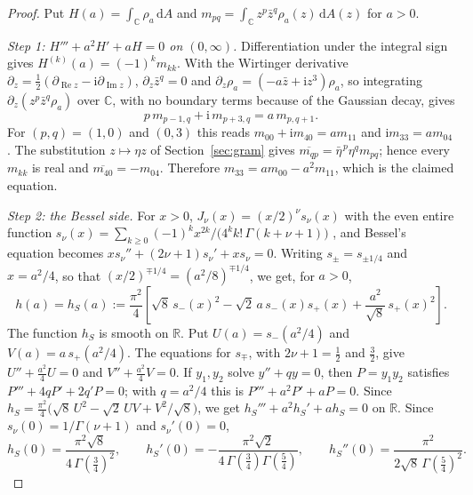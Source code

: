 \documentclass[twoside,10pt]{article}
\numberwithin{equation}{section}
\theoremstyle{slbody}
\theoremstyle{remark}
\newcommand{\C}{\mathbb C}
\newcommand{\dd}{\,\mathrm d}
\newcommand{\ii}{\mathrm i}
\begin{document}
\begin{proof}
Put \(H(a)=\int_\C\rho_a\dd A\) and
\(m_{pq}=\int_\C z^p\bar z^q\rho_a(z)\dd A(z)\) for \(a>0\).

\emph{Step 1: \(H'''+a^2H'+aH=0\) on \((0,\infty)\).}  Differentiation
under the integral sign gives \(H^{(k)}(a)=(-1)^km_{kk}\).  With the
Wirtinger derivative
\(\partial_z=\frac12(\partial_{\operatorname{Re}z}-\ii\partial_{\operatorname{Im}z})\),
\(\partial_z\bar z^q=0\) and
\(\partial_z\rho_a=(-a\bar z+\ii z^3)\rho_a\), so integrating
\(\partial_z(z^p\bar z^q\rho_a)\) over \(\C\), with no boundary terms
because of the Gaussian decay, gives
\[
p\,m_{p-1,q}+\ii\,m_{p+3,q}=a\,m_{p,q+1}.
\]
For \((p,q)=(1,0)\) and \((0,3)\) this reads
\(m_{00}+\ii m_{40}=am_{11}\) and \(\ii m_{33}=am_{04}\).  The
substitution \(z\mapsto\eta z\) of Section~\ref{sec:gram} gives
\(\overline{m_{qp}}=\bar\eta^{\,p}\eta^q m_{pq}\); hence every
\(m_{kk}\) is real and \(\overline{m_{40}}=-m_{04}\).  Therefore
\(m_{33}=am_{00}-a^2m_{11}\), which is the claimed equation.

\emph{Step 2: the Bessel side.}  For \(x>0\),
\(J_\nu(x)=(x/2)^\nu s_\nu(x)\) with the even entire function
\(s_\nu(x)=\sum_{k\geq0}(-1)^kx^{2k}/\bigl(4^kk!\,\Gamma(k+\nu+1)\bigr)\)
\cite[equation~(10.2.2)]{NISTHandbook2010}, and Bessel's equation
\cite[equation~(10.2.1)]{NISTHandbook2010} becomes
\(xs_\nu''+(2\nu+1)s_\nu'+xs_\nu=0\).  Writing \(s_\pm=s_{\pm1/4}\) and
\(x=a^2/4\), so that \((x/2)^{\mp1/4}=(a^2/8)^{\mp1/4}\), we get, for
\(a>0\),
\[
h(a)=h_S(a):=\frac{\pi^2}{4}\left[\sqrt8\,s_-(x)^2
-\sqrt2\,a\,s_-(x)s_+(x)+\frac{a^2}{\sqrt8}\,s_+(x)^2\right].
\]
The function \(h_S\) is smooth on \(\mathbb R\).  Put
\(U(a)=s_-(a^2/4)\) and \(V(a)=a\,s_+(a^2/4)\).  The equations for
\(s_\mp\), with \(2\nu+1=\frac12\) and \(\frac32\), give
\(U''+\frac{a^2}{4}U=0\) and \(V''+\frac{a^2}{4}V=0\).  If
\(y_1,y_2\) solve \(y''+qy=0\), then \(P=y_1y_2\) satisfies
\(P'''+4qP'+2q'P=0\); with \(q=a^2/4\) this is
\(P'''+a^2P'+aP=0\).  Since
\(h_S=\frac{\pi^2}{4}\bigl(\sqrt8\,U^2-\sqrt2\,UV+V^2/\sqrt8\bigr)\),
we get \(h_S'''+a^2h_S'+ah_S=0\) on \(\mathbb R\).  Since
\(s_\nu(0)=1/\Gamma(\nu+1)\) and \(s_\nu'(0)=0\),
\[
h_S(0)=\frac{\pi^2\sqrt8}{4\,\Gamma(\frac34)^2},
\qquad
h_S'(0)=-\frac{\pi^2\sqrt2}{4\,\Gamma(\frac34)\Gamma(\frac54)},
\qquad
h_S''(0)=\frac{\pi^2}{2\sqrt8\,\Gamma(\frac54)^2}.
\]


\end{proof}
\end{document}
